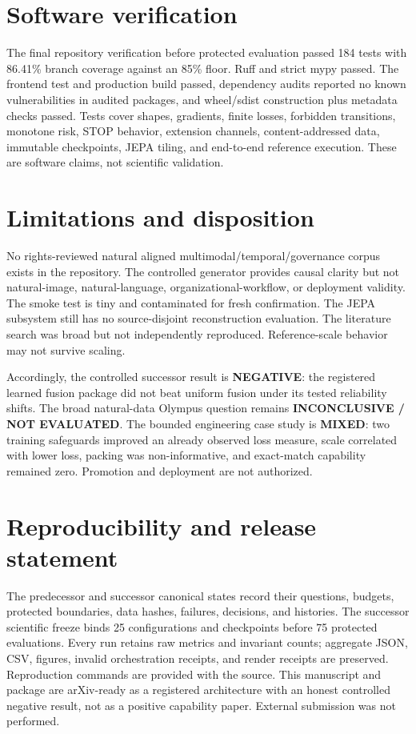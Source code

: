 \documentclass[10pt]{article}
\begin{document}
\section{Software verification}
The final repository verification before protected evaluation passed 184 tests with 86.41\%
branch coverage against an 85\% floor. Ruff and strict mypy passed. The frontend test and
production build passed, dependency audits reported no known vulnerabilities in audited
packages, and wheel/sdist construction plus metadata checks passed. Tests cover shapes,
gradients, finite losses, forbidden transitions, monotone risk, STOP behavior, extension
channels, content-addressed data, immutable checkpoints, JEPA tiling, and end-to-end
reference execution. These are software claims, not scientific validation.

\section{Limitations and disposition}
No rights-reviewed natural aligned multimodal/temporal/governance corpus exists in the
repository. The controlled generator provides causal clarity but not natural-image,
natural-language, organizational-workflow, or deployment validity. The smoke test is tiny
and contaminated for fresh confirmation. The JEPA subsystem still has no source-disjoint
reconstruction evaluation. The literature search was broad but not independently
reproduced. Reference-scale behavior may not survive scaling.

Accordingly, the controlled successor result is \textbf{NEGATIVE}: the registered learned
fusion package did not beat uniform fusion under its tested reliability shifts. The broad
natural-data Olympus question remains \textbf{INCONCLUSIVE / NOT EVALUATED}. The bounded
engineering case study is \textbf{MIXED}: two training safeguards improved an already
observed loss measure, scale correlated with lower loss, packing was non-informative, and
exact-match capability remained zero. Promotion and deployment are not authorized.

\section{Reproducibility and release statement}
The predecessor and successor canonical states record their questions, budgets, protected
boundaries, data hashes, failures, decisions, and histories. The successor scientific
freeze binds 25 configurations and checkpoints before 75 protected evaluations. Every
run retains raw metrics and invariant counts; aggregate JSON, CSV, figures, invalid
orchestration receipts, and render receipts are preserved. Reproduction commands are
provided with the source. This manuscript and package are arXiv-ready as a registered
architecture with an honest controlled negative result, not as a positive capability
paper. External submission was not performed.
\end{document}
